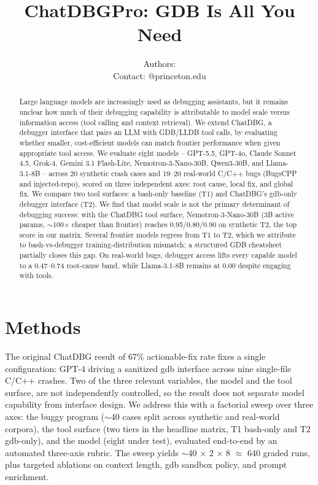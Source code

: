 \documentclass[11pt]{article}
\title{ChatDBGPro: GDB Is All You Need}
\author{Authors: \text{Ibraheem Amin, Shreyas Garimella, Anika Mehrotra} \\ Contact: \text{\{ia8920, sg6104, am9487\}} @princeton.edu}
\begin{document}
\maketitle
\thispagestyle{plain}
\pagestyle{plain}
\begin{abstract}
Large language models are increasingly used as debugging assistants, but it remains unclear how much of their debugging capability is attributable to model scale versus information access (tool calling and context retrieval). We extend ChatDBG, a debugger interface that pairs an LLM with GDB/LLDB tool calls, by evaluating whether smaller, cost-efficient models can match frontier performance when given appropriate tool access. We evaluate eight models -- GPT-5.5, GPT-4o, Claude Sonnet 4.5, Grok-4, Gemini 3.1 Flash-Lite, Nemotron-3-Nano-30B, Qwen3-30B, and Llama-3.1-8B -- across 20 synthetic crash cases and 19--20 real-world C/C++ bugs (BugsCPP and injected-repo), scored on three independent axes: root cause, local fix, and global fix. We compare two tool surfaces: a bash-only baseline (T1) and ChatDBG's gdb-only debugger interface (T2). We find that model scale is not the primary determinant of debugging success: with the ChatDBG tool surface, Nemotron-3-Nano-30B (3B active params, $\sim$100$\times$ cheaper than frontier) reaches 0.95/0.80/0.90 on synthetic T2, the top score in our matrix. Several frontier models regress from T1 to T2, which we attribute to bash-vs-debugger training-distribution mismatch; a structured GDB cheatsheet partially closes this gap. On real-world bugs, debugger access lifts every capable model to a 0.47--0.74 root-cause band, while Llama-3.1-8B remains at 0.00 despite engaging with tools.


\end{abstract}

\section{Methods}
\label{sec:methods}

The original ChatDBG result of 67\% actionable-fix rate \citep{levin2024chatdbg} fixes a single configuration: GPT-4 driving a sanitized gdb interface across nine single-file C/C++ crashes. Two of the three relevant variables, the model and the tool surface, are not independently controlled, so the result does not separate model capability from interface design. We address this with a factorial sweep over three axes: the buggy program ($\sim$40 cases split across synthetic and real-world corpora), the tool surface (two tiers in the headline matrix, T1 bash-only and T2 gdb-only), and the model (eight under test), evaluated end-to-end by an automated three-axis rubric. The sweep yields $\sim$40 $\times$ 2 $\times$ 8 $\approx$ 640 graded runs, plus targeted ablations on context length, gdb sandbox policy, and prompt enrichment.
\end{document}
